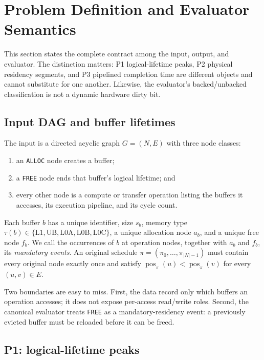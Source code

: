 \section{Problem Definition and Evaluator Semantics}\label{sec:supp-problem}

This section states the complete contract among the input, output, and evaluator. The distinction matters: P1 logical-lifetime peaks, P2 physical residency segments, and P3 pipelined completion time are different objects and cannot substitute for one another. Likewise, the evaluator's backed/unbacked classification is not a dynamic hardware dirty bit.

\subsection{Input DAG and buffer lifetimes}

The input is a directed acyclic graph $G=(N,E)$ with three node classes:
\begin{enumerate}
  \item an \texttt{ALLOC} node creates a buffer;
  \item a \texttt{FREE} node ends that buffer's logical lifetime; and
  \item every other node is a compute or transfer operation listing the buffers it accesses, its execution pipeline, and its cycle count.
\end{enumerate}
Each buffer $b$ has a unique identifier, size $s_b$, memory type
$\tau(b)\in\{\mathrm{L1},\mathrm{UB},\mathrm{L0A},\mathrm{L0B},\mathrm{L0C}\}$,
a unique allocation node $a_b$, and a unique free node $f_b$. We call the occurrences of $b$ at operation nodes, together with $a_b$ and $f_b$, its \emph{mandatory events}. An original schedule
$\pi=(\pi_0,\ldots,\pi_{|N|-1})$ must contain every original node exactly once and satisfy
$\operatorname{pos}_\pi(u)<\operatorname{pos}_\pi(v)$ for every $(u,v)\in E$.

Two boundaries are easy to miss. First, the data record only which buffers an operation accesses; it does not expose per-access read/write roles. Second, the canonical evaluator treats \texttt{FREE} as a mandatory-residency event: a previously evicted buffer must be reloaded before it can be freed.

\subsection{P1: logical-lifetime peaks}


